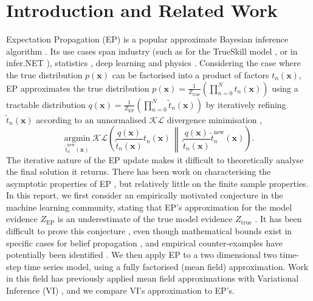 \documentclass{article}
\newcommand{\KLdivK}{\mathcal{K}}
\newcommand{\KLdivL}{\mathcal{L}}
\renewcommand{\vec}[1]{\mathbf{#1}}
\begin{document}
\section{Introduction and Related Work}
%
Expectation Propagation (EP) is a popular approximate Bayesian inference algorithm \citep{minka_expectation_2001}. Its use cases span industry (such as for the TrueSkill model \citep{herbrich_trueskill_2007}, or in infer.NET \citep{InferNET14}), statistics \citep{gelman_expectation_2014}, deep learning \citep{li_stochastic_2015} and physics \citep{opper_theory_2016}. Considering the case where the true distribution $p(\vec{x})$ can be factorised into a product of factors $t_{n}(\vec{x})$, EP approximates the true distribution $p(\vec{x}) = \frac{1}{Z_\mathrm{true}} \left( \prod_{n=0}^N t_{n}(\vec{x}) \right)$ using a tractable distribution $q(\vec{x}) = \frac{1}{Z_\mathrm{EP}} \left( \prod_{n=0}^N \tilde{t}_{n}(\vec{x}) \right)$ by iteratively refining $\tilde{t}_{n}(\vec{x})$ according to an unnormalised $\KLdivK \KLdivL$ divergence minimisation \citep{minka_divergence_2005},
%
\begin{equation} \label{eq:KL div}
\underset{\tilde{t}_{n}^\mathrm{new}(\vec{x})}{\mathrm{argmin}} \; \KLdivK \KLdivL \left( \frac{q(\vec{x})}{\tilde{t}_{n}(\vec{x})} t_{n}(\vec{x}) \, \middle\| \, \frac{q(\vec{x})}{\tilde{t}_{n}(\vec{x})} \tilde{t}_{n}^\mathrm{new}(\vec{x}) \right).
\end{equation}
%
The iterative nature of the EP update makes it difficult to theoretically analyse the final solution it returns. There has been work on characterising the asymptotic properties of EP \citep{dehaene_bounding_2015}, but relatively little on the finite sample properties. In this report, we first consider an empirically motivated conjecture in the machine learning community, stating that EP's approximation for the model evidence $Z_\mathrm{EP}$ is an underestimate of the true model evidence $Z_\mathrm{true}$ \citep{kuss_assessing_2005, cunningham_gaussian_2011}. It has been difficult to prove this conjecture \citep{paquet_towards_nodate}, even though mathematical bounds exist in specific cases for belief propagation \citep{weller_clamping_2014, willsky_loop_2008}, and empirical counter-examples have potentially been identified \citep{cunningham_expectation_2015}. We then apply EP to a two dimensional two time-step time series model, using a fully factorised (mean field) approximation. Work in this field has previously applied mean field approximations with Variational Inference (VI) \citep{turner_two_2011}, and we compare VI's approximation to EP's.
%
\end{document}
